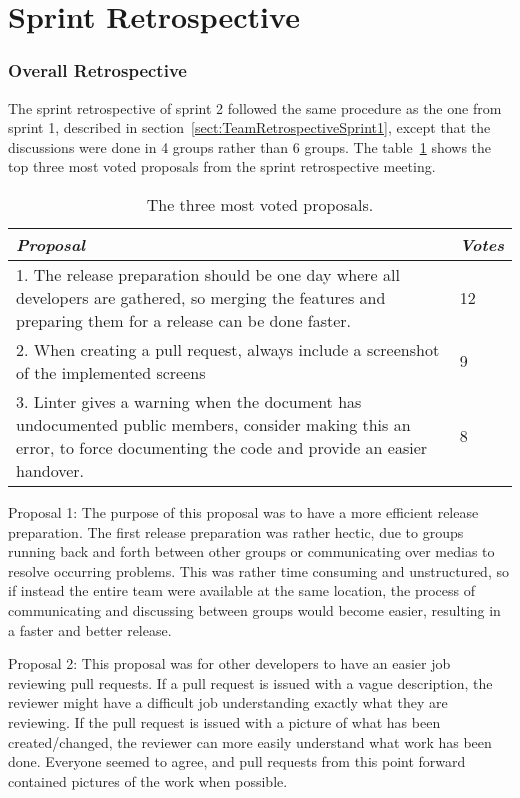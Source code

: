 \section{Sprint Retrospective}
\label{sect:RetrospectiveSprint2}
\subsubsection{Overall Retrospective}
\label{sect:TeamRetrospectiveSprint2}
The sprint retrospective of sprint 2 followed the same procedure as the one from sprint 1, described in section~\ref{sect:TeamRetrospectiveSprint1}, except that the discussions were done in 4 groups rather than 6 groups.
The table~\ref{table:retrospectiveIdeasSprint2} shows the top three most voted proposals from the sprint retrospective meeting.


\begin{table}[H]
\begin{tabularx}{\textwidth}{X|l}
\textit{Proposal}    & \textit{Votes}  \\ \hline
1. The release preparation should be one day where all developers are gathered, so merging the features and preparing them for a release can be done faster.  & 12  \\ \hline
2. When creating a pull request, always include a screenshot of the implemented screens & 9 \\ \hline
3. Linter gives a warning when the document has undocumented public members, consider making this an error, to force documenting the code and provide an easier handover. & 8  \\ \hline
\end{tabularx}
\caption{The three most voted proposals.}
\label{table:retrospectiveIdeasSprint2}
\end{table}

Proposal 1: The purpose of this proposal was to have a more efficient release preparation. The first release preparation was rather hectic, due to groups running back and forth between other groups or communicating over medias to resolve occurring problems. This was rather time consuming and unstructured, so if instead the entire team were available at the same location, the process of communicating and discussing between groups would become easier, resulting in a faster and better release.

Proposal 2: This proposal was for other developers to have an easier job reviewing pull requests. If a pull request is issued with a vague description, the reviewer might have a difficult job understanding exactly what they are reviewing. If the pull request is issued with a picture of what has been created/changed, the reviewer can more easily understand what work has been done. Everyone seemed to agree, and pull requests from this point forward contained pictures of the work when possible.

